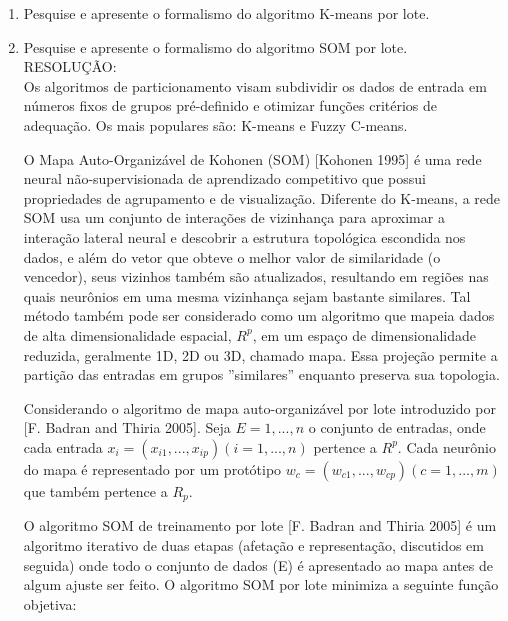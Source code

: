 \documentclass[a4paper,oneside,12pt]{article}
\begin{document}
\begin{enumerate}[1.]
\newpage

\item Pesquise e apresente o formalismo do algoritmo K-means por lote. \\ 


\item Pesquise e apresente o formalismo do algoritmo SOM por lote. \\

RESOLU\c{C}\~AO: \\

Os algoritmos de particionamento visam subdividir os dados de entrada em n\'umeros fixos de grupos pr\'e-definido e otimizar fun\c{c}\~oes crit\'erios de adequa\c{c}\~ao. Os mais populares s\~ao: K-means e Fuzzy C-means.

O Mapa Auto-Organiz\'avel de Kohonen (SOM) [Kohonen 1995] \'e uma rede neural n\~ao-supervisionada de aprendizado competitivo que possui propriedades de agrupamento e de visualiza\c{c}\~ao. Diferente do K-means, a rede SOM usa um conjunto de intera\c{c}\~oes de vizinhan\c{c}a para aproximar a intera\c{c}\~ao lateral neural e descobrir a estrutura topol\'ogica escondida nos dados, e al\'em do vetor que obteve o melhor valor de similaridade (o vencedor), seus vizinhos tamb\'em s\~ao atualizados, resultando em regi\~oes nas quais neur\^onios em uma mesma vizinhan\c{c}a sejam bastante similares. Tal m\'etodo tamb\'em pode ser considerado como um algoritmo que mapeia dados de alta dimensionalidade espacial, $R^p$, em um espa\c{c}o de dimensionalidade reduzida, geralmente 1D, 2D ou 3D, chamado mapa. Essa proje\c{c}\~ao permite a parti\c{c}\~ao das entradas em grupos ”similares” enquanto preserva sua topologia.

Considerando o algoritmo de mapa auto-organiz\'avel por lote introduzido por [F. Badran and Thiria 2005]. Seja $E = {1,...,n}$ o conjunto de entradas, onde cada entrada $x_{i} = (x_{i1}, ..., x_{ip}) (i = 1, ..., n)$ pertence a $R^p$. Cada neur\^onio do mapa \'e representado por um prot\'otipo $w_{c} = (w_{c1}, ..., w_{cp}) (c = 1, ..., m)$ que tamb\'em pertence a $R_{p}$.

O algoritmo SOM de treinamento por lote [F. Badran and Thiria 2005] \'e um algoritmo iterativo de duas etapas (afeta\c{c}\~ao e representa\c{c}\~ao, discutidos em seguida) onde todo o conjunto de dados (E) \'e apresentado ao mapa antes de algum ajuste ser feito. O algoritmo SOM por lote minimiza a seguinte fun\c{c}\~ao objetiva:


\end{enumerate}
\end{document}
